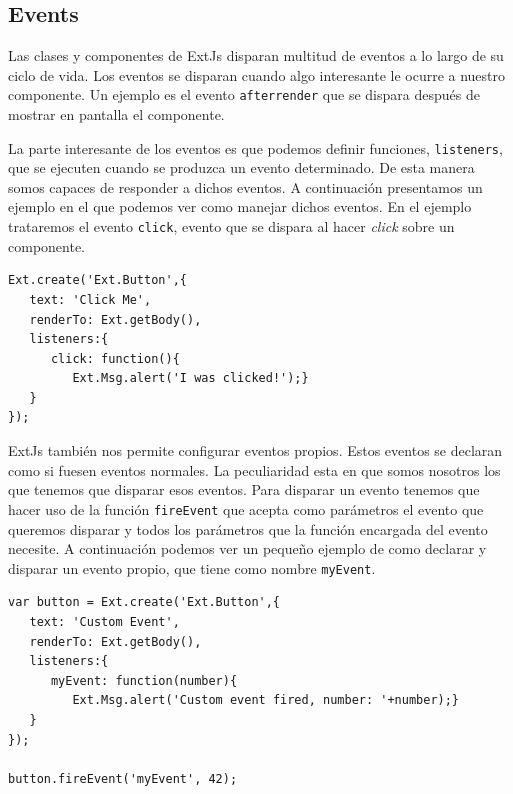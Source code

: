 	\subsection{Events}
		Las clases y componentes de ExtJs disparan multitud de eventos a lo largo de su ciclo de vida. Los eventos se disparan cuando algo
		interesante le ocurre a nuestro componente. Un ejemplo es el evento \texttt{afterrender} que se dispara después de mostrar en pantalla
		el componente.
		\par
		La parte interesante de los eventos es que podemos definir funciones, \texttt{listeners}, que se ejecuten cuando se produzca un evento
		determinado. De esta manera somos capaces de responder a dichos eventos. A continuación presentamos un ejemplo en el que podemos ver
		como manejar dichos eventos. En el ejemplo trataremos el evento \texttt{click}, evento que se dispara al hacer \emph{click} sobre un
		componente. 
		\begin{lstlisting}
Ext.create('Ext.Button',{
   text: 'Click Me',
   renderTo: Ext.getBody(),
   listeners:{
      click: function(){
         Ext.Msg.alert('I was clicked!');}
   }
});
		\end{lstlisting}
		\par
		ExtJs también nos permite configurar eventos propios. Estos eventos se declaran como si fuesen eventos normales. La peculiaridad esta
		en que somos nosotros los que tenemos que disparar esos eventos. Para disparar un evento tenemos que hacer uso de la función
		\texttt{fireEvent} que acepta como parámetros el evento que queremos disparar y todos los parámetros que la función encargada del
		evento necesite. A continuación podemos ver un pequeño ejemplo de como declarar y disparar un evento propio, que tiene como nombre
		\texttt{myEvent}.
		\begin{lstlisting}
var button = Ext.create('Ext.Button',{
   text: 'Custom Event',
   renderTo: Ext.getBody(),
   listeners:{
      myEvent: function(number){
         Ext.Msg.alert('Custom event fired, number: '+number);}
   }
});

button.fireEvent('myEvent', 42);
		\end{lstlisting}
